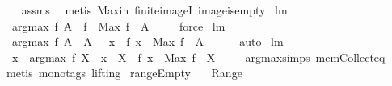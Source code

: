 \begin{isabellebody}
%
\isadelimproof
\ \ %
\endisadelimproof
%
\isatagproof
{}\isamarkupfalse%
\ assms\ \isamarkupfalse%
\ {\isacharparenleft}metis\ Max{\isacharunderscore}in\ finite{\isacharunderscore}imageI\ image{\isacharunderscore}is{\isacharunderscore}empty{\isacharparenright}%
\endisatagproof
{\isafoldproof}%
%
\isadelimproof
\isanewline
%
\endisadelimproof
\isanewline
\isanewline
{}\isamarkupfalse%
\ lm{}{}{}{\isacharcolon}\ \isanewline
\ \ {\isachardoublequoteopen}argmax\ f\ A\ {\isasymsubseteq}\ f\ {\isacharminus}{\isacharbackquote}\ {\isacharbraceleft}Max\ {\isacharparenleft}f\ {\isacharbackquote}\ A{\isacharparenright}{\isacharbraceright}{\isachardoublequoteclose}\ \isanewline
%
\isadelimproof
\ \ %
\endisadelimproof
%
\isatagproof
{}\isamarkupfalse%
\ force%
\endisatagproof
{\isafoldproof}%
%
\isadelimproof
\isanewline
%
\endisadelimproof
\isanewline
{}\isamarkupfalse%
\ lm{}{}{}{\isacharcolon}\ \isanewline
\ \ {\isachardoublequoteopen}argmax\ f\ A\ {\isacharequal}\ A\ {\isasyminter}\ {\isacharbraceleft}\ x\ {\isachardot}\ f\ x\ {\isacharequal}\ Max\ {\isacharparenleft}f\ {\isacharbackquote}\ A{\isacharparenright}\ {\isacharbraceright}{\isachardoublequoteclose}\ \isanewline
%
\isadelimproof
\ \ %
\endisadelimproof
%
\isatagproof
{}\isamarkupfalse%
\ auto%
\endisatagproof
{\isafoldproof}%
%
\isadelimproof
\isanewline
%
\endisadelimproof
\isanewline
{}\isamarkupfalse%
\ lm{}{}{}{\isacharcolon}\ \isanewline
\ \ {\isachardoublequoteopen}{\isacharparenleft}x\ {\isasymin}\ argmax\ f\ X{\isacharparenright}\ {\isacharequal}\ {\isacharparenleft}x\ {\isasymin}\ X\ {\isacharampersand}\ f\ x\ {\isacharequal}\ Max\ {\isacharparenleft}f\ {\isacharbackquote}\ X{\isacharparenright}{\isacharparenright}{\isachardoublequoteclose}\ \isanewline
%
\isadelimproof
\ \ %
\endisadelimproof
%
\isatagproof
{}\isamarkupfalse%
\ argmax{\isachardot}simps\ mem{\isacharunderscore}Collect{\isacharunderscore}eq\ \isamarkupfalse%
\ {\isacharparenleft}metis\ {\isacharparenleft}mono{\isacharunderscore}tags{\isacharcomma}\ lifting{\isacharparenright}{\isacharparenright}%
\endisatagproof
{\isafoldproof}%
%
\isadelimproof
\isanewline
%
\endisadelimproof
\isanewline
{}\isamarkupfalse%
\ rangeEmpty{\isacharcolon}\ \isanewline
\ \ {\isachardoublequoteopen}Range\ {\isacharminus}{\isacharbackquote}\ {\isacharbraceleft}{\isacharbraceleft}{\isacharbraceright}{\isacharbraceright}\ {\isacharequal}\ {\isacharbraceleft}{\isacharbraceleft}{\isacharbraceright}{\isacharbraceright}{\isachardoublequoteclose}\ \isanewline

\end{isabellebody}
